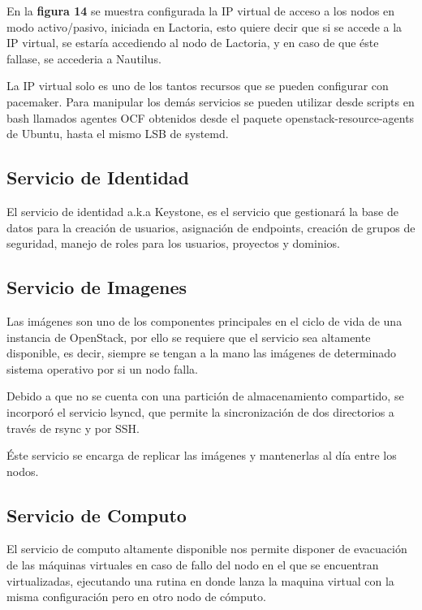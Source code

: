     
    En la \textbf{figura 14} se muestra configurada la IP virtual de acceso a los nodos en modo activo/pasivo, iniciada en Lactoria, esto quiere decir que si se accede a la IP virtual, se estaría accediendo al nodo de Lactoria, y en caso de que éste fallase, se accederia a Nautilus.
    
    La IP virtual solo es uno de los tantos recursos que se pueden configurar con pacemaker. Para manipular los demás servicios se pueden utilizar desde scripts en bash llamados agentes OCF obtenidos desde el paquete openstack-resource-agents de Ubuntu, hasta el mismo LSB de systemd.
    
    
    
    \subsection{Servicio de Identidad}
    
    El servicio de identidad a.k.a Keystone, es el servicio que gestionará la base de datos para la creación de usuarios, asignación de endpoints, creación de grupos de seguridad, manejo de roles para los usuarios, proyectos y dominios.
    
    
    \subsection{Servicio de Imagenes}
    
    Las imágenes son uno de los componentes principales en el ciclo de vida de una instancia de OpenStack, por ello se requiere que el servicio sea altamente disponible, es decir, siempre se tengan a la mano las imágenes de determinado sistema operativo por si un nodo falla.
    
    Debido a que no se cuenta con una partición de almacenamiento compartido, se incorporó el servicio lsyncd, que permite la sincronización de dos directorios a través de rsync y por SSH.
    
    Éste servicio se encarga de replicar las imágenes y mantenerlas al día entre los nodos.
    
    \subsection{Servicio de Computo}
    
    El servicio de computo altamente disponible nos permite disponer de evacuación de las máquinas virtuales en caso de fallo del nodo en el que se encuentran virtualizadas, ejecutando una rutina en donde lanza la maquina virtual con la misma configuración pero en otro nodo de cómputo.
    
